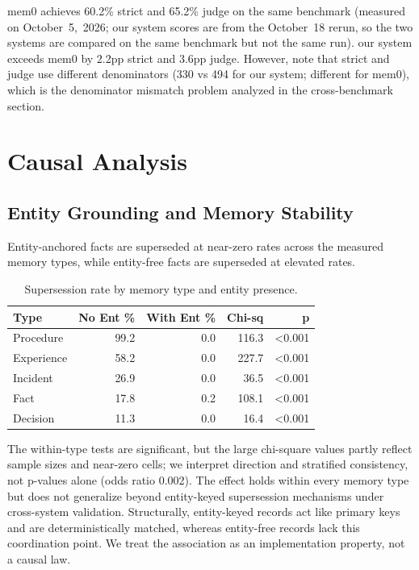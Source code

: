 \documentclass{llncs}
\begin{document}
mem0 achieves 60.2\% strict and 65.2\% judge on the same benchmark (measured on October~5,~2026; our system scores are from the October~18 rerun, so the two systems are compared on the same benchmark but not the same run). our system exceeds mem0 by 2.2pp strict and 3.6pp judge. However, note that strict and judge use different denominators (330 vs 494 for our system; different for mem0), which is the denominator mismatch problem analyzed in the cross-benchmark section.

\section{Causal Analysis}


\subsection{Entity Grounding and Memory Stability}


Entity-anchored facts are superseded at near-zero rates across the measured memory types, while entity-free facts are superseded at elevated rates.

\begin{table}[h]
\centering
\caption{Supersession rate by memory type and entity presence.}
\begin{tabular}{lrrrr}
\toprule
Type & No Ent \% & With Ent \% & Chi-sq & p \\
\midrule
Procedure & 99.2 & 0.0 & 116.3 & <0.001 \\
Experience & 58.2 & 0.0 & 227.7 & <0.001 \\
Incident & 26.9 & 0.0 & 36.5 & <0.001 \\
Fact & 17.8 & 0.2 & 108.1 & <0.001 \\
Decision & 11.3 & 0.0 & 16.4 & <0.001 \\
\bottomrule
\end{tabular}
\end{table}

The within-type tests are significant, but the large chi-square values partly reflect sample sizes and near-zero cells; we interpret direction and stratified consistency, not p-values alone (odds ratio 0.002). The effect holds within every memory type but does not generalize beyond entity-keyed supersession mechanisms under cross-system validation. Structurally, entity-keyed records act like primary keys and are deterministically matched, whereas entity-free records lack this coordination point. We treat the association as an implementation property, not a causal law.
\end{document}
